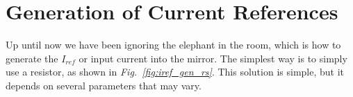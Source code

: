 \section{Generation of Current References}
\label{sec:Ireference}
Up until now we have been ignoring the elephant in the room, which is how to generate the $I_{ref}$ or input current into the mirror.  The simplest way is to simply use a resistor, as shown in \emph{Fig.~\ref{fig:iref_gen_rs}}.  This solution is simple, but it depends on several parameters that may vary.

